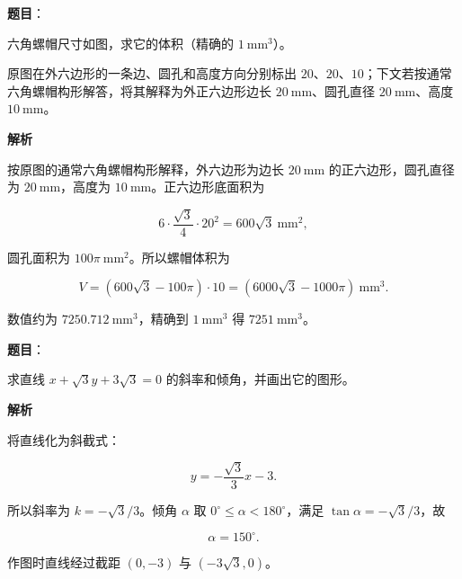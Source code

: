 \begin{answer}

\textbf{题目}：

六角螺帽尺寸如图，求它的体积（精确的 $1\ \mathrm{mm^3}$）。
\nopagebreak[4]
\begin{center}\end{center}
\nopagebreak[4]
\begin{gktip}
原图在外六边形的一条边、圆孔和高度方向分别标出 $20$、$20$、$10$；下文若按通常六角螺帽构形解答，将其解释为外正六边形边长 $20\ \mathrm{mm}$、圆孔直径 $20\ \mathrm{mm}$、高度 $10\ \mathrm{mm}$。
\end{gktip}

\textbf{解析}

按原图的通常六角螺帽构形解释，外六边形为边长 $20\ \mathrm{mm}$ 的正六边形，圆孔直径为 $20\ \mathrm{mm}$，高度为 $10\ \mathrm{mm}$。正六边形底面积为

\nopagebreak[4]
\[
6\cdot\frac{\sqrt3}{4}\cdot20^2=600\sqrt3\ \mathrm{mm^2},
\]

圆孔面积为 $100\pi\ \mathrm{mm^2}$。所以螺帽体积为

\nopagebreak[4]
\[
V=(600\sqrt3-100\pi)\cdot10
=(6000\sqrt3-1000\pi)\ \mathrm{mm^3}.
\]

数值约为 $7250.712\ \mathrm{mm^3}$，精确到 $1\ \mathrm{mm^3}$ 得 $7251\ \mathrm{mm^3}$。


\end{answer}
\begin{answer}

\textbf{题目}：

求直线 $x+\sqrt3y+3\sqrt3=0$ 的斜率和倾角，并画出它的图形。

\textbf{解析}

将直线化为斜截式：

\nopagebreak[4]
\[
y=-\frac{\sqrt3}{3}x-3.
\]

所以斜率为 $k=-\sqrt3/3$。倾角 $\alpha$ 取 $0^\circ\leqslant\alpha<180^\circ$，满足 $\tan\alpha=-\sqrt3/3$，故

\nopagebreak[4]
\[
\alpha=150^\circ.
\]

作图时直线经过截距 $(0,-3)$ 与 $(-3\sqrt3,0)$。


\end{answer}
